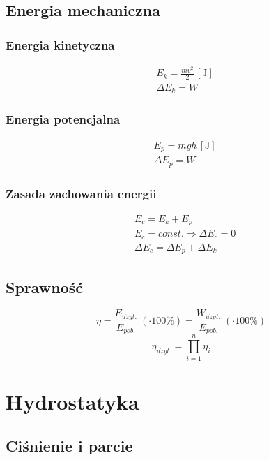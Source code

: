 \documentclass{article}
\numberwithin{equation}{section}
\newcommand{\unit}[1]{\, \left[\mathrm{#1}\right]}
\begin{document}
    \subsection{Energia mechaniczna}
      \subsubsection{Energia kinetyczna}
        \begin{align}
          &E_k = \frac{mv^2}{2} \unit{J}\\
          &\Delta E_k = W
        \end{align}
      \subsubsection{Energia potencjalna}
        \begin{align}
          &E_p = mgh \unit{J}\\
          &\Delta E_p = W
        \end{align}
      \subsubsection{Zasada zachowania energii}
        \begin{align}
          &E_c = E_k + E_p\\
          &E_c = const. \Rightarrow \Delta E_c = 0\\
          &\Delta E_c = \Delta E_p + \Delta E_k
        \end{align}
    \subsection{Sprawność}
      \begin{equation}
        \eta = \frac{E_{u\dot{z}yt.}}{E_{pob.}}\: (\cdot 100\%) = \frac{W_{u\dot{z}yt.}}{E_{pob.}}\: (\cdot 100\%)
      \end{equation}
      \begin{equation}
        \eta_{u\dot{z}yt.} = \prod_{i=1}^n \eta_i
      \end{equation}

  \newpage
  \section{Hydrostatyka}
    \subsection{Ciśnienie i parcie}
\end{document}
